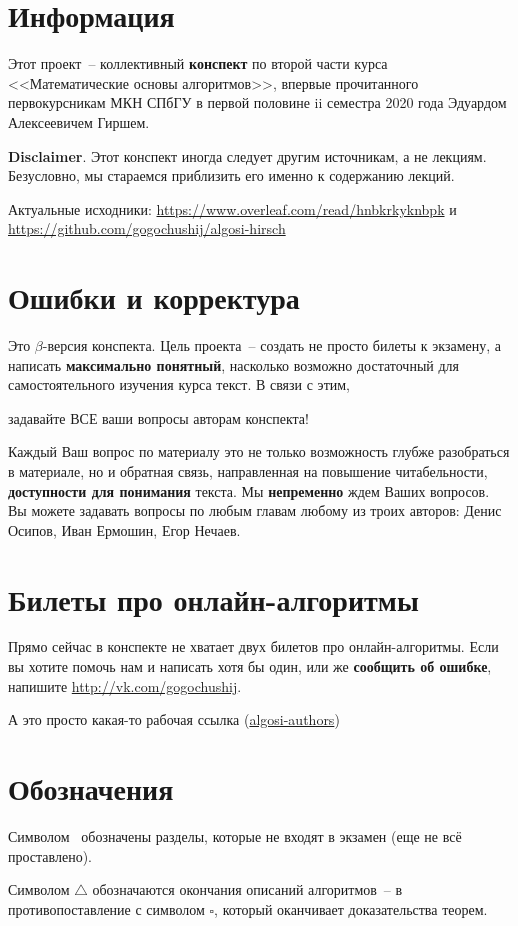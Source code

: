 \section*{Информация}

Этот проект~-- коллективный \textbf{конспект} по второй части курса <<Математические основы алгоритмов>>, впервые прочитанного первокурсникам МКН СПбГУ в первой половине ii семестра 2020 года Эдуардом Алексеевичем Гиршем.

\textbf{Disclaimer}. Этот конспект иногда следует другим источникам, а не лекциям. Безусловно, мы стараемся приблизить его именно к содержанию лекций.

Актуальные исходники: \url{https://www.overleaf.com/read/hnbkrkyknbpk} и \url{https://github.com/gogochushij/algosi-hirsch}

\section*{Ошибки и корректура}

Это $\beta$-версия конспекта. Цель проекта~-- создать не просто билеты к экзамену, а написать \textbf{максимально понятный}, насколько возможно достаточный для самостоятельного изучения курса текст. В связи с этим,

\begin{center} {\color{red} задавайте ВСЕ ваши вопросы авторам конспекта!}\end{center}

Каждый Ваш вопрос по материалу это не только возможность глубже разобраться в материале, но и обратная связь, направленная на повышение читабельности, \textbf{доступности для понимания} текста. Мы \textbf{непременно} ждем Ваших вопросов. Вы можете задавать вопросы по любым главам любому из троих авторов: Денис Осипов, Иван Ермошин, Егор Нечаев.

\section*{Билеты про онлайн-алгоритмы}

Прямо сейчас в конспекте не хватает двух билетов про онлайн-алгоритмы. Если вы хотите помочь нам и написать хотя бы один, или же \textbf{сообщить об ошибке}, напишите \url{http://vk.com/gogochushij}.

А это просто какая-то рабочая ссылка (\href{https://docs.google.com/spreadsheets/d/17MKhLVzCyYvEKlm6W5Bb-6uUDNyv0QLmdvuh4N6JfXI/edit?usp=sharing}{algosi-authors})

\section*{Обозначения}

Символом \heart~обозначены разделы, которые не входят в экзамен (еще не всё проставлено).

Символом $\bigtriangleup$ обозначаются окончания описаний алгоритмов~-- в противопоставление с символом $\square$, который оканчивает доказательства теорем. 
